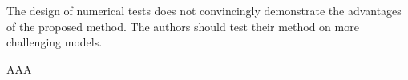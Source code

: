 \begin{point}
	The design of numerical tests does not convincingly demonstrate the advantages of the proposed method. The authors should test their method on more challenging models.
\end{point}

\begin{reply}
	AAA
\end{reply}

